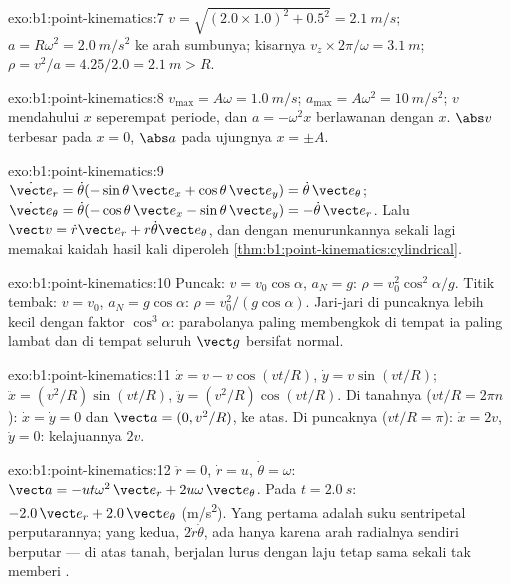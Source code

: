 \begin{solution}{exo:b1:point-kinematics:7}
$v = \sqrt{(2.0 \times 1.0)^2 + 0.5^2} = \qty{2.1}{m/s}$; $a = R\omega^2 =
\qty{2.0}{m/s^2}$ ke arah sumbunya; kisarnya $v_z \times 2\pi/\omega =
\qty{3.1}{m}$; $\rho = v^2/a = 4.25/2.0 = \qty{2.1}{m} > R$.
\end{solution}

\begin{solution}{exo:b1:point-kinematics:8}
$v_{\max} = A\omega = \qty{1.0}{m/s}$; $a_{\max} = A\omega^2 = \qty{10}{m/s^2}$;
$v$ mendahului $x$ seperempat periode, dan $a = -\omega^2x$ berlawanan dengan $x$.
$\abs v$ terbesar pada $x = 0$, $\abs a$ pada ujungnya $x = \pm A$.
\end{solution}

\begin{solution}{exo:b1:point-kinematics:9}
$\dot{\vect e}_r = \dot\theta(-\sin\theta\,\vect e_x + \cos\theta\,\vect e_y)
= \dot\theta\,\vect e_\theta$; $\dot{\vect e}_\theta = \dot\theta(-\cos\theta\,
\vect e_x - \sin\theta\,\vect e_y) = -\dot\theta\,\vect e_r$. Lalu
$\vect v = \dot r\vect e_r + r\dot\theta\vect e_\theta$, dan dengan
menurunkannya sekali lagi memakai kaidah hasil kali diperoleh 
\cref{thm:b1:point-kinematics:cylindrical}.
\end{solution}

\begin{solution}{exo:b1:point-kinematics:10}
Puncak: $v = v_0\cos\alpha$, $a_N = g$: $\rho = v_0^2\cos^2\alpha/g$.
Titik tembak: $v = v_0$, $a_N = g\cos\alpha$: $\rho = v_0^2/(g\cos\alpha)$.
Jari-jari di puncaknya lebih kecil dengan faktor $\cos^3\alpha$:
parabolanya paling membengkok di tempat ia paling lambat dan di tempat
seluruh $\vect g$ bersifat normal.
\end{solution}

\begin{solution}{exo:b1:point-kinematics:11}
$\dot x = v - v\cos(vt/R)$, $\dot y = v\sin(vt/R)$; $\ddot x = (v^2/R)
\sin(vt/R)$, $\ddot y = (v^2/R)\cos(vt/R)$. Di tanahnya ($vt/R = 2\pi n$):
$\dot x = \dot y = 0$ dan $\vect a = (0, v^2/R)$, ke atas. Di puncaknya
($vt/R = \pi$): $\dot x = 2v$, $\dot y = 0$: kelajuannya $2v$.
\end{solution}

\begin{solution}{exo:b1:point-kinematics:12}
$\ddot r = 0$, $\dot r = u$, $\dot\theta = \omega$: $\vect a = -ut\omega^2\,
\vect e_r + 2u\omega\,\vect e_\theta$. Pada $t = \qty{2.0}{s}$: $-2.0\,\vect e_r
+ 2.0\,\vect e_\theta$ (\unit{m/s^2}). Yang pertama adalah suku
sentripetal perputarannya; yang kedua, $2\dot r\dot\theta$, ada hanya
karena arah radialnya sendiri berputar --- di atas tanah, berjalan lurus
dengan laju tetap sama sekali tak memberi .
\end{solution}

